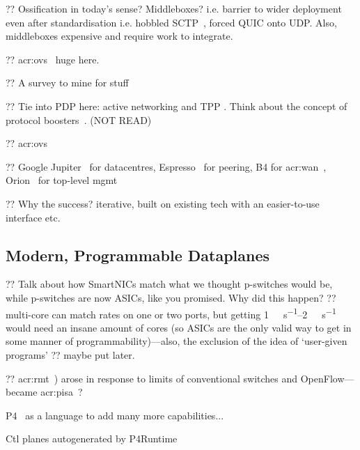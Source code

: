 ?? Ossification in today's sense? Middleboxes? i.e. barrier to wider deployment even after standardisation i.e. hobbled SCTP~\parencite{rfc4960}, forced QUIC onto UDP. Also, middleboxes expensive and require work to integrate.

?? \gls{acr:ovs}~\parencite{DBLP:conf/nsdi/PfaffPKJZRGWSSA15} huge here.

?? A survey to mine for stuff~\parencite{DBLP:journals/comsur/NunesMNOT14}

?? Tie into PDP here: active networking and TPP . Think about the concept of protocol boosters~\parencite{DBLP:journals/jsac/FeldmeierMSBMR98}. (NOT READ)

?? \gls{acr:ovs}~\parencite{DBLP:conf/sigcomm/TuWAP21}

?? Google Jupiter~\parencite{DBLP:conf/sigcomm/SinghOAAABBDFGK15} for datacentres, Espresso~\parencite{DBLP:conf/sigcomm/YapMRPHBHKNJLRR17} for peering, B4 for \gls{acr:wan}~\parencite{DBLP:conf/sigcomm/HongMAZABBJKLMP18}, Orion~\parencite{DBLP:conf/nsdi/FergusonGHKMMOP21} for top-level mgmt

?? Why the success? iterative, built on existing tech with an easier-to-use interface etc.

\subsection{Modern, Programmable Dataplanes}\label{sec:modern-pdps}
?? Talk about how SmartNICs match what we thought p-switches would be, while p-switches are now ASICs, like you promised. Why did this happen? ?? multi-core can match rates on one or two ports, but getting \qtyrange{1}{2}{\tera\bit\per\second} would need an insane amount of cores (so ASICs are the only valid way to get in some manner of programmability)---also, the exclusion of the idea of `user-given programs' ?? maybe put later.

?? \gls{acr:rmt}~\parencite{DBLP:conf/sigcomm/BosshartGKVMIMH13}) arose in response to limits of conventional switches and OpenFlow---became \gls{acr:pisa}~\parencite{barefoot-pisa}?

P4~\parencite{DBLP:journals/ccr/BosshartDGIMRSTVVW14} as a language to add many more capabilities...

Ctl planes autogenerated by P4Runtime~\parencite{p4-runtime}


